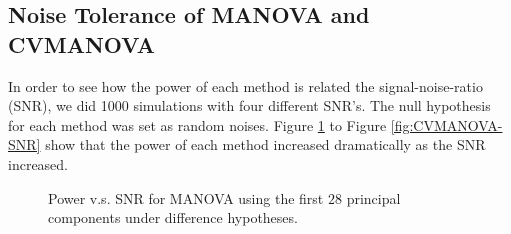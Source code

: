 \documentclass[english]{article}\usepackage[]{graphicx}\usepackage[]{color}
\begin{document}
\subsection{Noise Tolerance of MANOVA and CVMANOVA}

In order to see how the power of each method is related the signal-noise-ratio
(SNR), we did 1000 simulations with four different SNR's. The null
hypothesis for each method was set as random noises. Figure \ref{fig:MANOVA-SNR}
to Figure \ref{fig:CVMANOVA-SNR} show that the power of each method
increased dramatically as the SNR increased.

\begin{figure}[H]
\begin{centering}
\par\end{centering}

\centering{}\protect\caption{Power v.s. SNR for MANOVA using the first $28$ principal components
under difference hypotheses.\label{fig:MANOVA-SNR}}
\end{figure}
\end{document}
